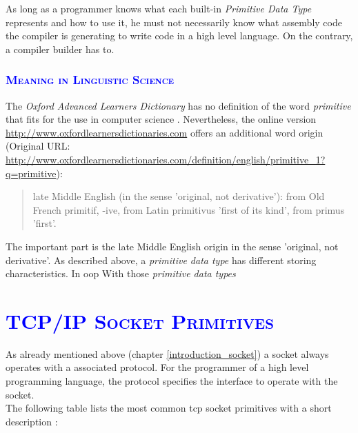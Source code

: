 \documentclass[xcolor=dvipsnames]{article}
\begin{document}
\noindent As long as a programmer knows what each built-in \textit{Primitive Data Type} represents and how to use it, he must not necessarily know what assembly code the compiler is generating to write code in a high level language. On the contrary, a compiler builder has to.\\

\subsubsection{\scshape{\textcolor{blue}{Meaning in Linguistic Science}}}

\noindent The \textit{Oxford Advanced Learners Dictionary} has no definition of the word \textit{primitive} that fits for the use in computer science \cite[p. 1197]{oxford_dictionary}. Nevertheless, the online version \url{http://www.oxfordlearnersdictionaries.com} offers an additional word origin (Original URL: \url{http://www.oxfordlearnersdictionaries.com/definition/english/primitive_1?q=primitive}):

\begin{quote}
late Middle English (in the sense 'original, not derivative'): from Old French primitif, -ive, from Latin primitivus 'first of its kind', from primus 'first'.
\end{quote}

\noindent The important part is the late Middle English origin in the sense 'original, not derivative'. As described above, a \textit{primitive data type} has different storing characteristics. In \gls{oop} With those \textit{primitive data types} 

\section{\scshape{\textcolor{blue}{TCP/IP Socket Primitives}}} \label{socket_primitives}

As already mentioned above (chapter \ref{introduction_socket}) a socket always operates with a associated protocol. For the programmer of a high level programming language, the protocol specifies the interface to operate with the socket.\\

\noindent The following table lists the most common \gls{tcp} socket primitives with a short description \cite{IBM_Anupama}:\\
\end{document}
